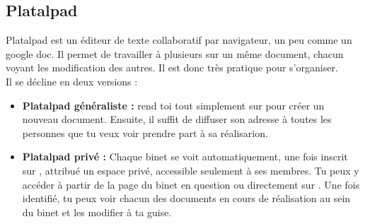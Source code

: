 \subsection{Platalpad}
\label{platalpad}

Platalpad est un éditeur de texte collaboratif par navigateur, un peu comme un google doc. Il permet de travailler à plusieurs sur un même document, chacun voyant les modification des autres. Il est donc très pratique pour s'organiser.\\
Il se décline en deux versions :
\begin{itemize}

\item \textbf{Platalpad généraliste :} rend toi tout simplement sur  pour créer un nouveau document. Ensuite, il suffit de diffuser son adresse à toutes les personnes que tu veux voir prendre part à sa réalisarion. \\

\item \textbf{Platalpad privé :} Chaque binet se voit automatiquement, une fois inscrit sur \fkz, attribué un espace privé, accessible seulement à ses membres. Tu peux y accéder à partir de la page \fkz du binet en question ou directement sur . Une fois identifié, tu peux voir chacun des documents en cours de réalisation au sein du binet et les modifier à ta guise.

\end{itemize}




